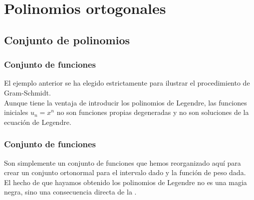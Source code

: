 \documentclass[12pt]{beamer}
\begin{document}
\section{Polinomios ortogonales}
\subsection{Conjunto de polinomios}

\begin{frame}
\frametitle{Conjunto de funciones}
El ejemplo anterior se ha elegido estrictamente para ilustrar el procedimiento de Gram-Schmidt.
\\
\bigskip
\pause
Aunque tiene la ventaja de introducir los polinomios de Legendre, las funciones iniciales $u_{n} = x^{n}$ no son funciones propias degeneradas y no son soluciones de la ecuación de Legendre.
\end{frame}
\begin{frame}
\frametitle{Conjunto de funciones}
Son simplemente un conjunto de funciones que hemos reorganizado aquí para crear un conjunto ortonormal para el intervalo dado y la función de peso dada. 
\\
\bigskip
\pause
El hecho de que hayamos obtenido los polinomios de Legendre no es una magia negra, sino una consecuencia directa de la .
\end{frame}
\end{document}
